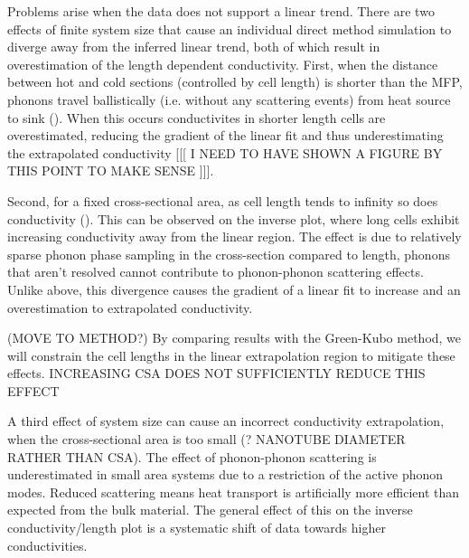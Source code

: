 \documentclass[%
preprint,                                  %
nofootinbib,
 amsmath,amssymb,
 aps,
]{revtex4-1}
\begin{document}

Problems arise when the data does not support a linear trend. There are two effects of finite system size that cause an individual direct method simulation to diverge away from the inferred linear trend, both of which result in overestimation of the length dependent conductivity. First, when the distance between hot and cold sections (controlled by cell length) is shorter than the MFP, phonons travel ballistically (i.e. without any scattering events) from heat source to sink (\citet{Sellan2010}). When this occurs conductivites in shorter length cells are overestimated, reducing the gradient of the linear fit and thus underestimating the extrapolated conductivity [[[ I NEED TO HAVE SHOWN A FIGURE BY THIS POINT TO MAKE SENSE ]]].

Second, for a fixed cross-sectional area, as cell length tends to infinity so does conductivity (\cite{Hu2011}). This can be observed on the inverse plot, where long cells exhibit increasing conductivity away from the linear region. The effect is due to relatively sparse phonon phase sampling in the cross-section compared to length, phonons that aren't resolved cannot contribute to phonon-phonon scattering effects. Unlike above, this divergence causes the gradient of a linear fit to increase and an overestimation to extrapolated conductivity. 


(MOVE TO METHOD?) By comparing results with the Green-Kubo method, we will constrain the cell lengths in the linear extrapolation region to mitigate these effects. INCREASING CSA DOES NOT SUFFICIENTLY REDUCE THIS EFFECT


A third effect of system size can cause an incorrect conductivity extrapolation, when the cross-sectional area is too small (\citet{Thomas2010}? NANOTUBE DIAMETER RATHER THAN CSA). The effect of phonon-phonon scattering is underestimated in small area systems due to a restriction of the active phonon modes. Reduced scattering means heat transport is artificially more efficient than expected from the bulk material. The general effect of this on the inverse conductivity/length plot is a systematic shift of data towards higher conductivities. 
\end{document}
